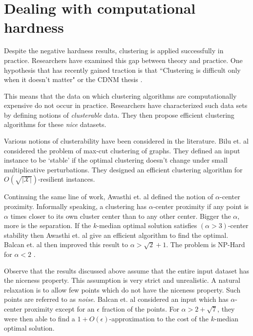 \documentclass[letterpaper,12pt,titlepage,oneside,final]{book}
\newcommand{\mc}{\mathcal}
\begin{document}
\section{Dealing with computational hardness}
Despite the negative hardness results, clustering is applied successfully in practice. Researchers have examined this gap between theory and practice. One hypothesis that has recently gained traction is that ``Clustering is difficult only when it doesn't matter" or the CDNM thesis \cite{daniely2012clustering}. 

This means that the data on which clustering algorithms are computationally expensive do not occur in practice. Researchers have characterized such data sets by defining notions of \textit{clusterable} data. They then propose efficient clustering algorithms for these {\em nice} datasets.

Various notions of clusterability have been considered in the literature. Bilu et. al \cite{bilu2012stable} considered the problem of max-cut clustering of graphs. They defined an input instance to be `stable' if the optimal clustering doesn't change under small multiplicative perturbations. They designed an efficient clustering algorithm for $O(\sqrt{|\mc X|})$-resilient instances. 

Continuing the same line of work, Awasthi et. al \cite{awasthi2012center} defined the notion of $\alpha$-center proximity. Informally speaking, a clustering has $\alpha$-center proximity if any point is $\alpha$ times closer to its own cluster center than to any other center. Bigger the $\alpha$, more is the separation. If the $k$-median optimal solution satisfies $(\alpha > 3)$-center stability then Awasthi et. al \cite{awasthi2012center} give an efficient algorithm to find the optimal. Balcan et. al \cite{balcan2012clustering} then improved this result to $\alpha > \sqrt{2}+1$. The problem is NP-Hard for $\alpha < 2$ \cite{ben2014data}. 

Observe that the results discussed above assume that the entire input dataset has the niceness property. This assumption is very strict and unrealistic. A natural relaxation is to allow few points which do not have the niceness property. Such points are referred to as \textit{noise}. Balcan et. al \cite{balcan2012clustering} considered an input which has $\alpha$-center proximity except for an $\epsilon$ fraction of the points. For $\alpha > 2 + \sqrt{7}$, they were then able to find a $1+O(\epsilon)$-approximation to the cost of the $k$-median optimal solution. 
\end{document}
